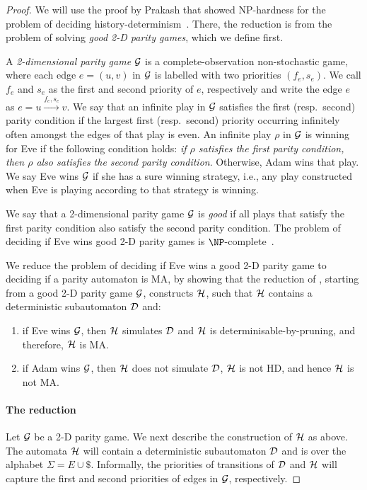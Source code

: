 \begin{proof}
    We will use the proof by Prakash that showed NP-hardness for the problem of deciding history-determinism~\cite{Pra24a}. There, the reduction is from the problem of solving \emph{good 2-D parity games}, which we define first. 

    A \emph{2-dimensional parity game} $\mathcal{G}$ is a complete-observation non-stochastic game, where each edge $e = (u,v)$ in $\mathcal{G}$ is labelled with two priorities $(f_e,s_e)$. We call $f_e$ and $s_e$ as the first and second priority of $e$, respectively and write the edge $e$ as $e=u\xrightarrow{f_e,s_e}v$. We say that an infinite play in $\mathcal{G}$ satisfies the first (resp.\ second) parity condition if the largest first (resp.\ second) priority occurring infinitely often amongst the edges of that play is even. An infinite play $\rho$ in $\mathcal{G}$ is winning for Eve if the following condition holds: \emph{if $\rho$ satisfies the first parity condition, then $\rho$ also satisfies the second parity condition}. Otherwise, Adam wins that play. We say Eve wins $\mathcal{G}$ if she has a sure winning strategy, i.e., any play constructed when Eve is playing according to that strategy is winning.

    We say that a 2-dimensional parity game $\mathcal{G}$ is \emph{good} if all plays that satisfy the first parity condition also satisfy the second parity condition. The problem of deciding if Eve wins good 2-D parity games is $\NP$-complete~\cite[Lemma 13]{Pra24a}.  

    We reduce the problem of deciding if Eve wins a good 2-D parity game to deciding if a parity automaton is MA, by showing that the reduction of \cite{Pra24a}, starting from a good 2-D parity game $\mathcal{G}$, constructs $\mathcal{H}$, such that $\mathcal{H}$ contains a deterministic subautomaton $\mathcal{D}$ and:
    \begin{enumerate}
        \item if Eve wins $\mathcal{G}$, then $\mathcal{H}$ simulates $\mathcal{D}$ and $\mathcal{H}$ is determinisable-by-pruning, and therefore, $\mathcal{H}$ is MA.
        \item if Adam wins $\mathcal{G}$, then $\mathcal{H}$ does not simulate $\mathcal{D}$, $\mathcal{H}$ is not HD, and hence $\mathcal{H}$ is not MA.
    \end{enumerate}
    \paragraph*{The reduction}
    Let $\mathcal{G}$ be a 2-D parity game. We next describe the construction of $\mathcal{H}$ as above. The automata $\mathcal{H}$ will contain a deterministic subautomaton $\mathcal{D}$ and is over the alphabet $\Sigma = E\cup \$$. Informally, the priorities of transitions of $\mathcal{D}$ and $\mathcal{H}$ will capture the first and second priorities of edges in $\mathcal{G}$, respectively. 
    

\end{proof}
